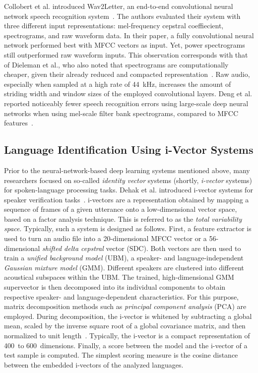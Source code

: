 Collobert et al. introduced Wav2Letter, an end-to-end convolutional neural network speech recognition system~\cite{collobert2016wav2letter}. The authors evaluated their system with three different input representations: mel-frequency cepstral coeffiecient, spectrograms, and raw waveform data. In their paper, a fully convolutional neural network performed best with MFCC vectors as input. Yet, power spectrograms still outperformed raw waveform inputs. This observation corresponds with that of Dieleman et al., who also noted that spectrograms are computationally cheaper, given their already reduced and compacted representation~\cite{dieleman2014end}. Raw audio, especially when sampled at a high rate of \SI{44}{\kilo\hertz}, increases the amount of striding width and window sizes of the employed convolutional layers.
Deng et al. reported noticeably fewer speech recognition errors using large-scale deep neural networks when using mel-scale filter bank spectrograms, compared to MFCC features~\cite{deng2013recent}.

\subsection{Language Identification Using i-Vector Systems}
\label{sec:i-vector-systems}
Prior to the neural-network-based deep learning systems mentioned above, many researchers focused on so-called \emph{identity vector} systems (shortly, \emph{i-vector} systems) for spoken-language processing tasks. Dehak et al. introduced i-vector systems for speaker verification tasks~\cite{dehak2011front}. i-vectors are a representation obtained by mapping a sequence of frames of a given utterance onto a low-dimensional vector space, based on a factor analysis technique. This is referred to as the \emph{total variability space}. Typically, such a system is designed as follows. First, a feature extractor is used to turn an audio file into a \num{20}-dimensional MFCC vector or a \num{56}-dimensional \emph{shifted delta cepstral} vector (SDC). Both vectors are then used to train a \emph{unified background model} (UBM), a speaker- and language-independent \emph{Gaussian mixture model} (GMM). Different speakers are clustered into different acoustical subspaces within the UBM. The trained, high-dimensional GMM supervector is then decomposed into its individual components to obtain respective speaker- and language-dependent characteristics. For this purpose, matrix decomposition methods such as \emph{principal component analysis} (PCA) are employed. During decomposition, the i-vector is whitened by subtracting a global mean, scaled by the inverse square root of a global covariance matrix, and then normalized to unit length~\cite{garcia2011analysis}. Typically, the i-vector is a compact representation of \num{400}~to \num{600}~dimensions. Finally, a score between the model and the i-vector of a test sample is computed. The simplest scoring measure is the cosine distance between the embedded i-vectors of the analyzed languages.

